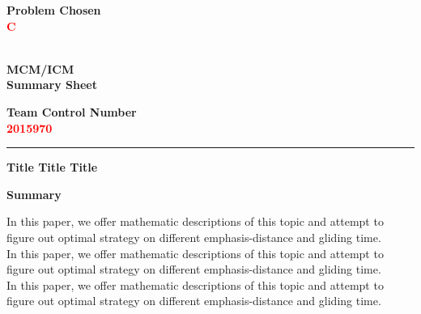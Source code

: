 \documentclass[12pt]{article}%
\newcommand{\headset}{{\Large\the\year}\\MCM/ICM\\Summary Sheet}
\begin{document}
\newpage
\thispagestyle{empty}
\vspace*{-5pc}%
\setmainfont{Times New Roman}

\begin{center}
	\begingroup
	\setlength{\parindent}{0pt}
	\begin{minipage}[t]{0.33\linewidth}
		\bfseries\centering%
		Problem Chosen\\[0.7pc]
		{\Huge\textbf{\textcolor{red}{C}}}\\[2.8pc]
	\end{minipage}%
	\begin{minipage}[t]{0.33\linewidth}
		\centering%
		\textbf{\headset}%
	\end{minipage}%
	\begin{minipage}[t]{0.33\linewidth}
		\centering\bfseries%
		Team Control Number\\[0.7pc]
		{\Huge\textbf{\textcolor{red}{2015970}}}\\[2.8pc]
	\end{minipage}\par
	\vskip 10pt%
	\rule{\linewidth}{1.5pt}\par
	\endgroup
	\vskip 10pt%
\end{center}
\begin{center}
	\vspace{10pt}
	{\normalfont \LARGE \textbf{ Title Title Title} }\par
	\par		%
	\vspace{7pt}
	\noindent
	{\textbf{Summary}}
\end{center}


 In this paper, we offer mathematic descriptions of this topic and attempt to figure out optimal strategy on different emphasis-distance and gliding time.
~\\

 In this paper, we offer mathematic descriptions of this topic and attempt to figure out optimal strategy on different emphasis-distance and gliding time.
 ~\\
 
  In this paper, we offer mathematic descriptions of this topic and attempt to figure out optimal strategy on different emphasis-distance and gliding time.
\end{document}
